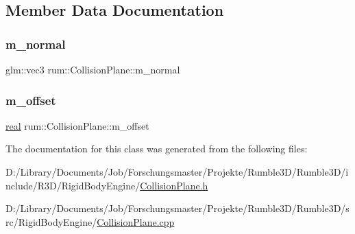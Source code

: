\subsection{Member Data Documentation}
\mbox{\label{classrum_1_1_collision_plane_aa2f3d73f116cb6965cd561f25ea4b67e}} 
\subsubsection{\texorpdfstring{m\+\_\+normal}{m\_normal}}
{\footnotesize\ttfamily glm\+::vec3 rum\+::\+Collision\+Plane\+::m\+\_\+normal\hspace{0.3cm}{\ttfamily [protected]}}

\mbox{\label{classrum_1_1_collision_plane_a0630544f46ad1830d7f73f94746f1f25}} 
\subsubsection{\texorpdfstring{m\+\_\+offset}{m\_offset}}
{\footnotesize\ttfamily \mbox{\hyperlink{namespacerum_a7e8cca23573d5eaead0f138cbaa4862c}{real}} rum\+::\+Collision\+Plane\+::m\+\_\+offset\hspace{0.3cm}{\ttfamily [protected]}}



The documentation for this class was generated from the following files\+:\begin{DoxyCompactItemize}
\item 
D\+:/\+Library/\+Documents/\+Job/\+Forschungsmaster/\+Projekte/\+Rumble3\+D/\+Rumble3\+D/include/\+R3\+D/\+Rigid\+Body\+Engine/\mbox{\hyperlink{_collision_plane_8h}{Collision\+Plane.\+h}}\item 
D\+:/\+Library/\+Documents/\+Job/\+Forschungsmaster/\+Projekte/\+Rumble3\+D/\+Rumble3\+D/src/\+Rigid\+Body\+Engine/\mbox{\hyperlink{_collision_plane_8cpp}{Collision\+Plane.\+cpp}}\end{DoxyCompactItemize}
